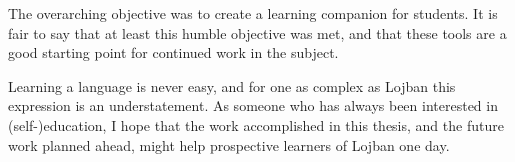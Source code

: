 The overarching objective was to create a learning companion for students. It is fair to say that at least this humble objective was met,
and that these tools are a good starting point for continued work in the subject.\newline

Learning a language is never easy, and for one as complex as Lojban this expression is an understatement. As someone who has always been interested
in (self-)education, I hope that the work accomplished in this thesis, and the future work planned ahead, might help prospective
learners of Lojban one day.